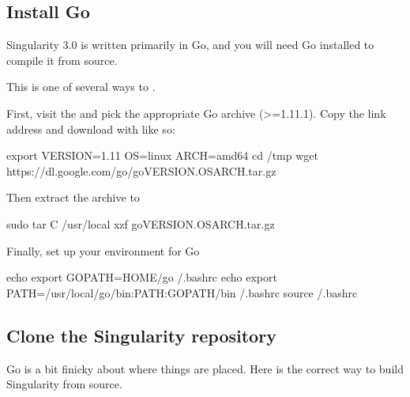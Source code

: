 \documentclass[letterpaper,10pt,english]{sphinxmanual}
\begin{document}
\subsection{Install Go}
\label{\detokenize{quick_start:install-go}}
Singularity 3.0 is written primarily in Go, and you will need Go installed to
compile it from source.

This is one of several ways to .

First, visit the  and pick the
appropriate Go archive (\textgreater{}=1.11.1). Copy the link address and download
with  like so:

%
\begin{sphinxVerbatim}[commandchars=\\\{\}]
\PYGZdl{} export VERSION=1.11 OS=linux ARCH=amd64
\PYGZdl{} cd /tmp
\PYGZdl{} wget https://dl.google.com/go/go\PYGZdl{}VERSION.\PYGZdl{}OS\PYGZhy{}\PYGZdl{}ARCH.tar.gz
\end{sphinxVerbatim}

Then extract the archive to 

%
\begin{sphinxVerbatim}[commandchars=\\\{\}]
\PYGZdl{} sudo tar \PYGZhy{}C /usr/local \PYGZhy{}xzf go\PYGZdl{}VERSION.\PYGZdl{}OS\PYGZhy{}\PYGZdl{}ARCH.tar.gz
\end{sphinxVerbatim}

Finally, set up your environment for Go

%
\begin{sphinxVerbatim}[commandchars=\\\{\}]
\PYGZdl{} echo \PYGZsq{}export GOPATH=\PYGZdl{}\PYGZob{}HOME\PYGZcb{}/go\PYGZsq{} \PYGZgt{}\PYGZgt{} \PYGZti{}/.bashrc
\PYGZdl{} echo \PYGZsq{}export PATH=/usr/local/go/bin:\PYGZdl{}\PYGZob{}PATH\PYGZcb{}:\PYGZdl{}\PYGZob{}GOPATH\PYGZcb{}/bin\PYGZsq{} \PYGZgt{}\PYGZgt{} \PYGZti{}/.bashrc
\PYGZdl{} source \PYGZti{}/.bashrc
\end{sphinxVerbatim}


\subsection{Clone the Singularity repository}
\label{\detokenize{quick_start:clone-the-singularity-repository}}
Go is a bit finicky about where things are placed. Here is the correct way to
build Singularity from source.
\end{document}
